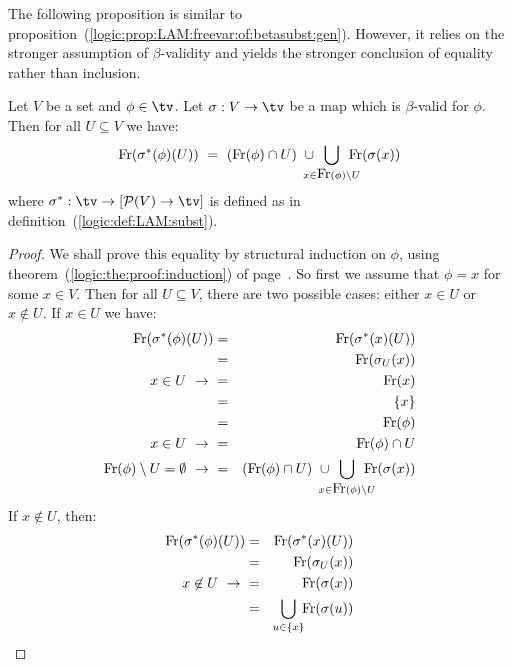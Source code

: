 The following proposition is similar to 
proposition~(\ref{logic:prop:LAM:freevar:of:betasubst:gen}). However,
it relies on the stronger assumption of $\beta$-validity and yields the
stronger conclusion of equality rather than inclusion.
\begin{prop}\label{logic:prop:LAM:freevar:of:betasubst:gen:valid}
Let $V$ be a set and $\phi\in\tv$. Let $\sigma:V\to\tv$ be a map which is
$\beta$-valid for $\phi$. Then for all $U\subseteq V$ we have:
    \[
        \free(\sigma^{*}(\phi)(U)) 
            \ =\ 
        (\free(\phi)\cap U)
        \ \cup
        \!\!\!\!\!\!
        \bigcup_{x\in\free(\phi)\setminus U} 
        \!\!\!\!\!\!
        \free(\sigma(x))
    \]
where $\sigma^{*}:\tv\to[{\cal P}(V)\to\tv]$ is defined as in 
definition~(\ref{logic:def:LAM:subst}).
\end{prop}
\begin{proof}
We shall prove this equality by structural induction on $\phi$, using
theorem~(\ref{logic:the:proof:induction}) of 
page~\pageref{logic:the:proof:induction}. So first we assume that $\phi=x$ 
for some $x\in V$. Then for all $U\subseteq V$, there are two possible cases: 
either $x\in U$ or $x\not\in U$. If $x\in U$ we have:
    \begin{eqnarray*}
        \free(\sigma^{*}(\phi)(U))
        &=&\free(\sigma^{*}(x)(U))\\
        &=&\free(\sigma_{U}(x))\\
        \mbox{$x\in U\ \rightarrow\ $}&=&\free(x)\\
         &=&\{x\}\\
         &=&\free(\phi)\\
        \mbox{$x\in U\ \rightarrow\ $}&=&\free(\phi)\cap U\\
        \mbox{$\free(\phi)\setminus U = \emptyset\ \rightarrow\ $} &=& 
            (\free(\phi)\cap U)
            \ \cup
            \!\!\!\!\!\!
            \bigcup_{x\in\free(\phi)\setminus U} 
            \!\!\!\!\!\!
            \free(\sigma(x))
    \end{eqnarray*}
If $x\not\in U$, then:
     \begin{eqnarray*}
        \free(\sigma^{*}(\phi)(U))
        &=&\free(\sigma^{*}(x)(U))\\
        &=&\free(\sigma_{U}(x))\\
        \mbox{$x\not\in U\ \rightarrow\ $}&=&\free(\sigma(x))\\
        &=&
        \!\!\!
        \bigcup_{u\in\{x\}} 
        \!\!
        \free(\sigma(u))\\

\end{eqnarray*}
\end{proof}
